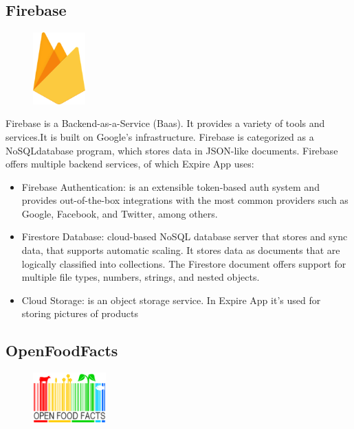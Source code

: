 \subsection{Firebase}
\begin{figure}
\vspace{-0.8cm}
\includegraphics[width=0.18\textwidth]{Images/external_serv/firebase.png}
\end{figure}
Firebase is a Backend-as-a-Service (Baas). It provides a variety of tools and services.It is built on Google’s infrastructure. Firebase is categorized as a NoSQLdatabase program, which stores data in JSON-like documents.
Firebase offers multiple backend services, of which Expire App uses:
\begin{itemize}
    \item Firebase Authentication: is an extensible token-based auth system and provides out-of-the-box integrations with the most common providers such as Google, Facebook, and Twitter, among others.
    \item Firestore Database: cloud-based NoSQL database server that stores and sync data, that supports automatic scaling. It stores data as documents that are logically classified into collections. The Firestore document offers support for multiple file types, numbers, strings, and nested objects.
    \item Cloud Storage: is an object storage service. In Expire App it's used for storing pictures of products
\end{itemize}


\subsection{OpenFoodFacts}
\begin{figure}
\vspace{-0.8cm}
\includegraphics[width=0.25\textwidth]{Images/external_serv/openfoodfacts1.png}
\end{figure}

